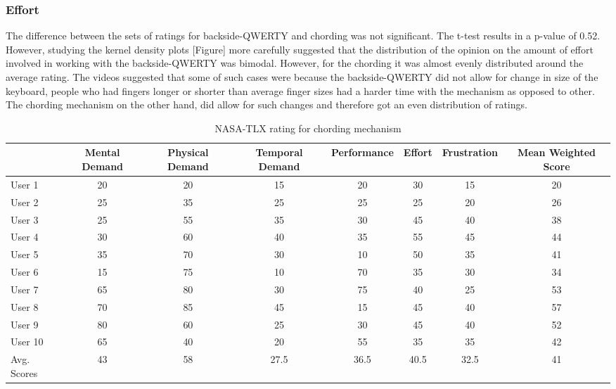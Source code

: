 \subsubsection{Effort}

The difference between the sets of ratings for backside-QWERTY and
chording was not significant. The t-test results in a p-value of
0.52. However, studying the kernel density plots [Figure] more
carefully suggested that the distribution of the opinion on the amount
of effort involved in working with the backside-QWERTY was
bimodal. However, for the chording it was almost evenly distributed
around the average rating. The videos suggested that some of such
cases were because the backside-QWERTY did not allow for change in
size of the keyboard, people who had fingers longer or shorter than
average finger sizes had a harder time with the mechanism as opposed
to other. The chording mechanism on the other hand, did allow for such
changes and therefore got an even distribution of ratings.

\begin{table*}
	\centering
		\begin{tabular}{|l|c|c|c|c|c|c|c|} \hline
		                         & Mental Demand & Physical Demand & Temporal Demand & Performance & Effort & Frustration & Mean Weighted Score \\ \hline
			 User 1 & 20 & 20 & 15 & 20 & 30 & 15 & 20\\ \hline
			 User 2 & 25 & 35 & 25 & 25 & 25 & 20 & 26\\ \hline
			 User 3 & 25 & 55 & 35 & 30 & 45 & 40 & 38\\ \hline
			 User 4 & 30 & 60 & 40 & 35 & 55 & 45 & 44\\ \hline
			 User 5 & 35 & 70 & 30 & 10 & 50 & 35 & 41\\ \hline
			 User 6 & 15 & 75 & 10 & 70 & 35 & 30 & 34\\ \hline
			 User 7 & 65 & 80 & 30 & 75 & 40 & 25 & 53\\ \hline
			 User 8 & 70 & 85 & 45 & 15 & 45 & 40 & 57\\ \hline
			 User 9 & 80 & 60 & 25 & 30 & 45 & 40 & 52\\ \hline
			 User 10 & 65 & 40 & 20 & 55 & 35 & 35 & 42\\ \hline  
			 Avg. Scores & 43 & 58 & 27.5 & 36.5 & 40.5 & 32.5 & 41\\ \hline
		\end{tabular}
	\caption{NASA-TLX rating for chording mechanism}
	\label{tab:StatisticsForTextCorpora}
\end{table*}
